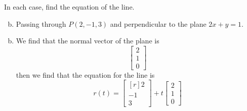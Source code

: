 \documentclass[../main.tex]{subfiles}
\begin{document}
In each case, find the equation of the line.
\begin{enumerate}[a)]
	\setcounter{enumi}{1}
	\item Passing through $P(2, -1, 3)$ and perpendicular to the plane $2x + y = 1$.
\end{enumerate}

\solution
\begin{enumerate}[a)]
	\setcounter{enumi}{1}
	\item We find that the normal vector of the plane is 
		\[ \begin{bmatrix}2\\1\\0\end{bmatrix} \]
		then we find that the equation for the line is
		\[ r(t) = \begin{bmatrix*}[r]2\\-1\\3\end{bmatrix*} + t\begin{bmatrix}2\\1\\0\end{bmatrix} \]
\end{enumerate}
\end{document}
